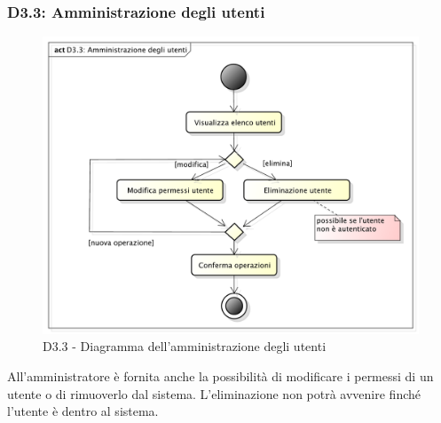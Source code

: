 		\subsubsection{D3.3: Amministrazione degli utenti} %
		\label{ssub:amministrazione_degli_utenti}
		\begin{figure}[!htbp]
			\centering
			\centerline{\includegraphics[scale=0.45]{./images/D3_3.pdf}}
			\caption{D3.3 - Diagramma dell'amministrazione degli utenti}
		\end{figure}
		\noindent
		All'amministratore è fornita anche la possibilità di modificare i permessi di un utente o di rimuoverlo dal sistema. L'eliminazione non potrà avvenire finché l'utente è dentro al sistema.





